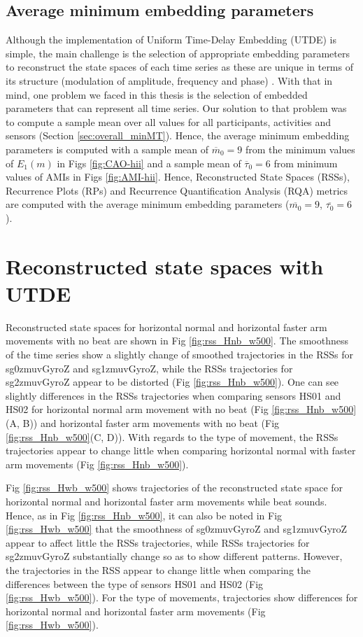 \newpage
\subsection{Average minimum embedding parameters}
Although the implementation of Uniform Time-Delay Embedding (UTDE) 
is simple, the main challenge is the selection of appropriate embedding 
parameters to reconstruct the state spaces of each time series
as these are unique in terms of its structure (modulation of amplitude, 
frequency and phase) \citep{ frank2010, sama2013, bradley2015}.
With that in mind, one problem we faced in this thesis is the
selection of embedded parameters that can represent all time series. 
Our solution to that problem was to compute a sample mean over 
all values for all participants, activities and sensors
(Section \ref{sec:overall_minMT}).
Hence, the average minimum embedding parameters is computed with 
a sample mean of $\overline{m}_0=9$ from the minimum values 
of $E_{1}(m)$ in Figs \ref{fig:CAO-hii} and a sample mean 
of $\overline{\tau}_0=6$ from minimum values of AMIs in Figs \ref{fig:AMI-hii}.
Hence, Reconstructed State Spaces (RSSs), Recurrence Plots (RPs) and
Recurrence Quantification Analysis (RQA) metrics
are computed with the average minimum embedding parameters 
($\overline{m_0}=9$, $\overline{\tau_0}=6$).

\section{Reconstructed state spaces with UTDE}
Reconstructed state spaces for horizontal normal and horizontal faster 
arm movements with no beat are shown in Fig \ref{fig:rss_Hnb_w500}.
The smoothness of the time series show a slightly change of smoothed 
trajectories in the RSSs for sg0zmuvGyroZ and sg1zmuvGyroZ, while the 
RSSs trajectories for sg2zmuvGyroZ appear to be distorted 
(Fig \ref{fig:rss_Hnb_w500}).
One can see slightly differences in the RSSs trajectories when comparing 
sensors HS01 and HS02 for horizontal normal arm movement with no beat 
(Fig \ref{fig:rss_Hnb_w500}(A, B)) and horizontal faster arm movements 
with no beat (Fig \ref{fig:rss_Hnb_w500}(C, D)).
With regards to the type of movement, the RSSs trajectories appear 
to change little when comparing horizontal normal with faster arm movements 
(Fig \ref{fig:rss_Hnb_w500}).

Fig \ref{fig:rss_Hwb_w500} shows trajectories of the reconstructed 
state space for horizontal normal and horizontal faster arm movements 
while beat sounds. Hence, as in Fig \ref{fig:rss_Hnb_w500}, 
it can also be noted in Fig \ref{fig:rss_Hwb_w500} that the smoothness 
of sg0zmuvGyroZ and sg1zmuvGyroZ appear to affect little the RSSs 
trajectories, while RSSs trajectories for sg2zmuvGyroZ substantially change 
so as to show different patterns. However, the trajectories in the RSS 
appear to change little when comparing the differences between the type 
of sensors HS01 and HS02 (Fig \ref{fig:rss_Hwb_w500}).
For the type of movements, trajectories show differences for horizontal
normal and horizontal faster arm movements (Fig \ref{fig:rss_Hwb_w500}).

